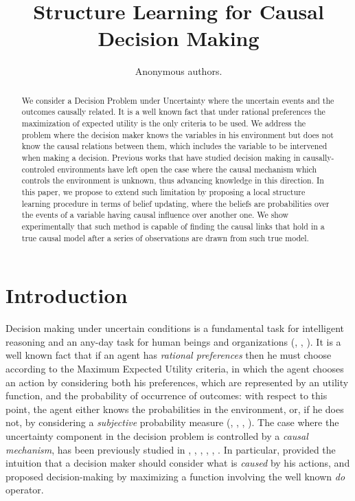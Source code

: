 \documentclass[letterpaper]{article}
\title{Structure Learning for Causal Decision Making}
\author{Anonymous authors.} %
\begin{document}
\maketitle

\begin{abstract}
We consider a Decision Problem under Uncertainty where the uncertain events and the outcomes causally related. It is a well known fact that under rational preferences the maximization of expected utility is the only criteria to be used. We address the problem where the decision maker knows the variables in his environment but does not know the causal relations between them, which includes the variable to be intervened when making a decision. Previous works that have studied decision making in causally-controled environments have left open the case where the causal mechanism which controls the environment is unknown, thus advancing knowledge in this direction. In this paper, we propose to extend such limitation by proposing a local structure learning procedure in terms of belief updating, where the beliefs are probabilities over the events of a variable having causal influence over another one.  We show experimentally that such method is capable of finding the causal links that hold in a true causal model after a series of observations are drawn from such true model. 
\end{abstract}

\section{Introduction}
Decision making under uncertain conditions is a fundamental task for intelligent reasoning and an any-day task for human beings and organizations (\cite{savage1954the}, \cite{danks2014unifying}, \cite{lake2017building}). It is a well known fact that if an agent has \textit{rational preferences} then he must choose according to the Maximum Expected Utility criteria, in which the agent chooses an action by considering both his preferences, which are represented by an utility function, and the probability of occurrence of outcomes: with respect to this point, the agent either knows the probabilities in the environment, or, if he does not, by considering a \textit{subjective} probability measure (\cite{von1944theory}, \cite{savage1954the}, \cite{bernardo2000bayesian}, \cite{gilboa2009decision}). The case where the uncertainty component in the decision problem is controlled by a \textit{causal mechanism}, has been previously studied in \cite{joyce1999foundations}, \cite{pearl2009causality}, \cite{lattimoreNIPS2016}, \cite{sen2017identifying}, \cite{gonzalez2018playing}, \cite{2019arXiv190202279G}. In particular, \cite{joyce1999foundations} provided the intuition that a decision maker should consider what is \textit{caused} by his actions, and \cite{pearl2009causality} proposed decision-making by maximizing a function involving the well known \textit{do} operator.
\end{document}
